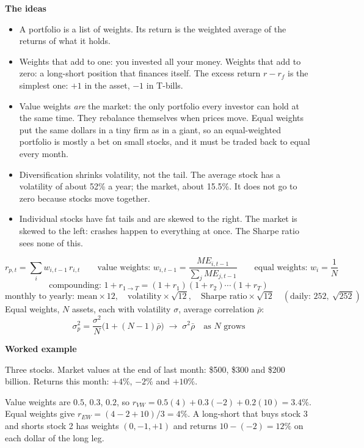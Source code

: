 \documentclass[11pt]{article}
\newcounter{ex}[section]
\newcommand{\head}[1]{\par\medskip\textbf{#1}\par}
\begin{document}
\head{The ideas}
\begin{itemize}
\item A portfolio is a list of weights. Its return is the weighted average of the returns of what it holds.
\item Weights that add to one: you invested all your money. Weights that add to zero: a long-short position that finances
itself. The excess return $r - r_{f}$ is the simplest one: $+1$ in the asset, $-1$ in T-bills.
\item Value weights \emph{are} the market: the only portfolio every investor can hold at the same time. They rebalance
themselves when prices move. Equal weights put the same dollars in a tiny firm as in a giant, so an equal-weighted
portfolio is mostly a bet on small stocks, and it must be traded back to equal every month.
\item Diversification shrinks volatility, not the tail. The average stock has a volatility of about 52\% a year; the
market, about 15.5\%. It does not go to zero because stocks move together.
\item Individual stocks have fat tails and are skewed to the right. The market is skewed to the left: crashes happen to
everything at once. The Sharpe ratio sees none of this.
\end{itemize}

\begin{keybox}
\[ r_{p,t} = \sum_{i} w_{i,t-1}\, r_{i,t}
\qquad\text{value weights: } w_{i,t-1} = \frac{ME_{i,t-1}}{\sum_{j} ME_{j,t-1}}
\qquad\text{equal weights: } w_{i} = \frac{1}{N} \]
\[ \text{compounding: } 1 + r_{1\to T} = (1+r_{1})(1+r_{2})\cdots(1+r_{T}) \]
\[ \text{monthly to yearly: mean} \times 12, \quad \text{volatility} \times \sqrt{12}, \quad \text{Sharpe ratio} \times \sqrt{12}
   \quad(\text{daily: } 252,\ \sqrt{252}) \]
Equal weights, $N$ assets, each with volatility $\sigma$, average correlation $\bar\rho$:
\[ \sigma_{p}^{2} = \frac{\sigma^{2}}{N}\big(1 + (N-1)\bar\rho\big) \;\longrightarrow\; \sigma^{2}\bar\rho \quad\text{as } N \text{ grows} \]
\end{keybox}

\head{Worked example}
Three stocks. Market values at the end of last month: \$500, \$300 and \$200 billion. Returns this month: $+4\%$, $-2\%$
and $+10\%$.

Value weights are $0.5$, $0.3$, $0.2$, so $r_{VW} = 0.5(4) + 0.3(-2) + 0.2(10) = 3.4\%$. Equal weights give
$r_{EW} = (4 - 2 + 10)/3 = 4\%$. A long-short that buys stock 3 and shorts stock 2 has weights $(0, -1, +1)$ and returns
$10 - (-2) = 12\%$ on each dollar of the long leg.
\end{document}
